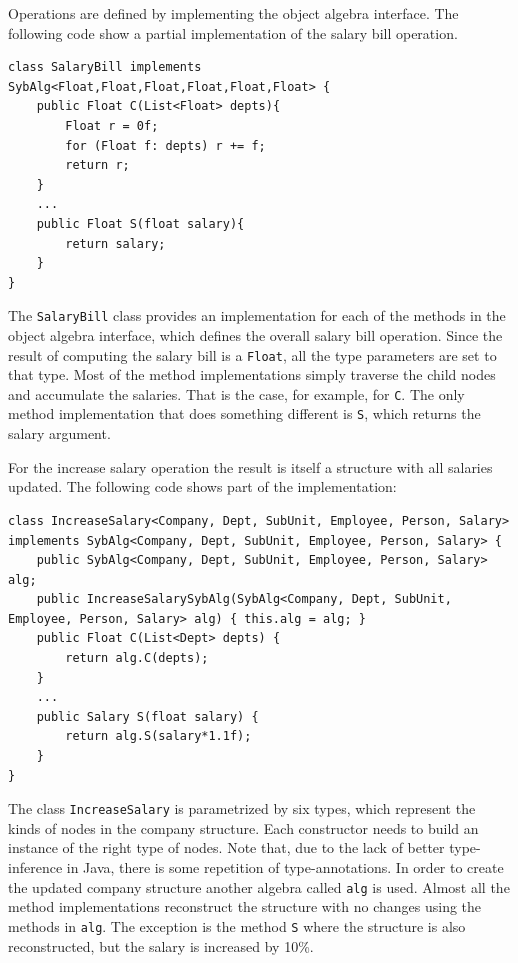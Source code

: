 Operations are defined by implementing the object algebra interface.
The following code show a partial implementation of the salary bill
operation.

\begin{lstlisting}[numbers=none]
class SalaryBill implements SybAlg<Float,Float,Float,Float,Float,Float> {
	public Float C(List<Float> depts){
		Float r = 0f;
		for (Float f: depts) r += f;
		return r;
	}
	...
	public Float S(float salary){
		return salary;
	}
}
\end{lstlisting}

The \lstinline{SalaryBill} class provides an implementation for each
of the methods in the object algebra interface, which defines the
overall salary bill operation. Since the result of computing the
salary bill is a \lstinline{Float}, all the type parameters are set to
that type. Most of the method implementations simply traverse the
child nodes and accumulate the salaries. That is the case, for
example, for \lstinline{C}. The only method implementation that does
something different is \lstinline{S}, which returns the salary
argument.

For the increase salary operation the result is itself a structure
with all salaries updated. The following code shows part of the
implementation:

\begin{lstlisting}[numbers=none]
class IncreaseSalary<Company, Dept, SubUnit, Employee, Person, Salary> implements SybAlg<Company, Dept, SubUnit, Employee, Person, Salary> {
	public SybAlg<Company, Dept, SubUnit, Employee, Person, Salary> alg;
	public IncreaseSalarySybAlg(SybAlg<Company, Dept, SubUnit, Employee, Person, Salary> alg) { this.alg = alg; }
	public Float C(List<Dept> depts) {
		return alg.C(depts);
	}
	...
	public Salary S(float salary) {
		return alg.S(salary*1.1f);
	}
}
\end{lstlisting}

The class \lstinline{IncreaseSalary} is parametrized by six types,
which represent the kinds of nodes in the company structure. Each
constructor needs to build an instance of the right type of nodes.
Note that, due to the lack of better type-inference in Java, there is
some repetition of type-annotations. In order to create the updated
company structure another algebra called \lstinline{alg} is used.
Almost all the method implementations reconstruct the structure with
no changes using the methods in \lstinline{alg}. The exception is the
method \lstinline{S} where the structure is also reconstructed, but
the salary is increased by 10\%.

